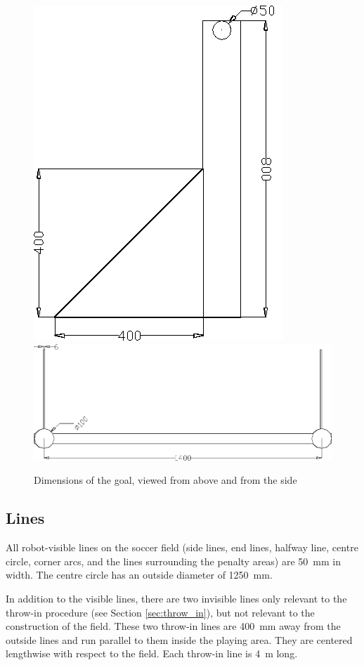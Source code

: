 \documentclass[12pt]{article}
\begin{document}
\begin{figure}[htp]
\begin{center}
\leavevmode
\includegraphics[width=0.4\columnwidth]{figs/goal_with_dims_left.png}\\
\vspace{10pt}
\includegraphics[width=0.8\columnwidth]{figs/goal_with_dims_top.png}
\caption{Dimensions of the goal, viewed from above and from the side}
\label{fig:goal_dimensions}
\end{center}
\end{figure}

\subsection{Lines}\label{sec:field_lines}

All robot-visible lines on the soccer field (side lines, end lines, halfway line, centre circle, corner arcs, and the lines surrounding the penalty areas) are 50~mm in width. The centre circle has an outside diameter of 1250~mm.

In addition to the visible lines, there are two invisible lines only relevant to the throw-in procedure (see Section \ref{sec:throw_in}), but not relevant to the construction of the field. These two throw-in lines are 400~mm away from the outside lines and run parallel to them inside the playing area. They are centered lengthwise with respect to the field. Each throw-in line is 4~m long.
\end{document}
